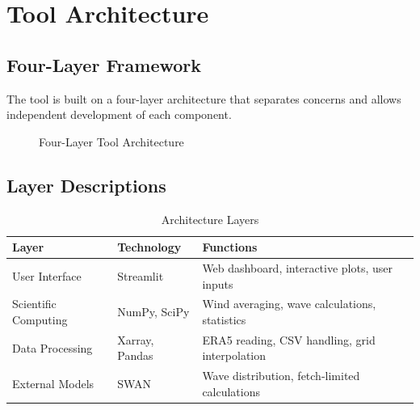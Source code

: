 \documentclass[12pt]{article}
\begin{document}
\newpage

\section{Tool Architecture}

\subsection{Four-Layer Framework}

The tool is built on a four-layer architecture that separates concerns and allows independent development of each component.

\begin{figure}[H]
\centering
{}
\caption{Four-Layer Tool Architecture}
\label{fig:architecture}
\end{figure}

\subsection{Layer Descriptions}

\begin{table}[H]
\centering
\caption{Architecture Layers}
\begin{tabular}{|p{3cm}|p{4cm}|p{6cm}|}
\hline
\textbf{Layer} & \textbf{Technology} & \textbf{Functions} \\
\hline
User Interface & Streamlit & Web dashboard, interactive plots, user inputs \\
Scientific Computing & NumPy, SciPy & Wind averaging, wave calculations, statistics \\
Data Processing & Xarray, Pandas & ERA5 reading, CSV handling, grid interpolation \\
External Models & SWAN & Wave distribution, fetch-limited calculations \\
\hline
\end{tabular}
\end{table}
\end{document}
